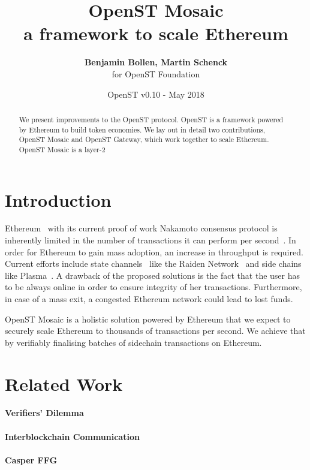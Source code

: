 \documentclass[12pt,a4paper]{article}
\title{OpenST Mosaic\\\sc\Large{a framework to scale Ethereum}}
\author{\textbf{Benjamin Bollen, Martin Schenck}\\ for OpenST Foundation}
\date{OpenST v0.10 - May 2018}
\begin{document}
\maketitle

\begin{abstract}
We present improvements to the OpenST protocol.
OpenST is a framework powered by Ethereum to build token economies.
We lay out in detail two contributions, OpenST Mosaic and OpenST Gateway,
which work together to scale Ethereum.
OpenST Mosaic is a layer-2
\end{abstract}

%
%
\section{Introduction}
Ethereum~\cite{ethereum} with its current proof of work Nakamoto consensus protocol is inherently limited in the number of transactions it can perform per second~\cite{verifiersdilemma}.
In order for Ethereum to gain mass adoption, an increase in throughput is required.
Current efforts include state channels~\cite{lightning} like the Raiden Network~\cite{raiden} and side chains~\cite{sidechains} like Plasma~\cite{plasma}.
A drawback of the proposed solutions is the fact that the user has to be always online in order to ensure integrity of her transactions.
Furthermore, in case of a mass exit, a congested Ethereum network could lead to lost funds.

OpenST Mosaic is a holistic solution powered by Ethereum that we expect to securely scale Ethereum to thousands of transactions per second.
We achieve that by verifiably finalising batches of sidechain transactions on Ethereum.


%
%
\section{Related Work}

\paragraph{Verifiers' Dilemma}
\cite{verifiersdilemma}

\paragraph{Interblockchain Communication}
\cite{cosmos}

\paragraph{Casper FFG}
\cite{casperffg}
\end{document}
